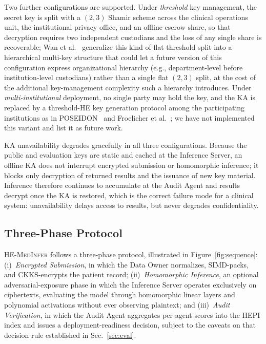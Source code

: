 \documentclass[journal,compsoc]{IEEEtran}
\newcommand{\HEPI}{\textsc{HEPI}}          %
\newcommand{\framework}{\textsc{HE-MedInfer}}
\begin{document}
Two further configurations are supported. Under \emph{threshold} key
management, the secret key is split with a $(2,3)$ Shamir scheme across the
clinical operations unit, the institutional privacy office, and an offline
escrow share, so that decryption requires two independent custodians and the
loss of any single share is recoverable; Wan et
al.~\cite{wan2025hierarchicalthreshold} generalize this kind of flat
threshold split into a hierarchical multi-key structure that could let a
future version of this configuration express organizational hierarchy
(e.g., department-level before institution-level custodians) rather than a
single flat $(2,3)$ split, at the cost of the additional key-management
complexity such a hierarchy introduces. Under \emph{multi-institutional}
deployment, no single party may hold the key, and the KA is replaced by a
threshold-HE key generation protocol among the participating institutions as
in POSEIDON~\cite{sav2021poseidon} and Froelicher et
al.~\cite{froelicher2021scalable}; we have not implemented this variant and
list it as future work.

KA unavailability degrades gracefully in all three configurations. Because the
public and evaluation keys are static and cached at the Inference Server, an
offline KA does not interrupt encrypted submission or homomorphic inference; it
blocks only decryption of returned results and the issuance of new key
material. Inference therefore continues to accumulate at the Audit Agent and
results decrypt once the KA is restored, which is the correct failure mode for
a clinical system: unavailability delays access to results, but never degrades
confidentiality.

\subsection{Three-Phase Protocol}

\framework{} follows a three-phase protocol, illustrated in
Figure~\ref{fig:sequence}: (i)~\emph{Encrypted Submission}, in which the
Data Owner normalizes, SIMD-packs, and CKKS-encrypts the patient record;
(ii)~\emph{Homomorphic Inference}, an optional adversarial-exposure phase in
which the Inference Server operates exclusively on ciphertexts, evaluating
the model through homomorphic linear layers and polynomial activations
without ever observing plaintext; and (iii)~\emph{Audit Verification}, in
which the Audit Agent aggregates per-agent scores into the \HEPI{} index and
issues a deployment-readiness decision, subject to the caveats on that
decision rule established in Sec.~\ref{sec:eval}.
\end{document}
